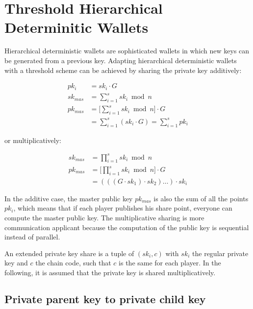 \section{Threshold Hierarchical Determinitic Wallets}

Hierarchical deterministic wallets are sophisticated wallets in which new keys
can be generated from a previous key. Adapting hierarchical deterministic
wallets with a threshold scheme can be achieved by sharing the private key
additively:

\begin{equation*}
\begin{split}
  pk_i     &= sk_i \cdot G \\
  sk_{mas} &= \sum_{i=1}^{s} sk_i \bmod n \\
  pk_{mas} &= \Bigg[ \sum_{i=1}^{s} sk_i \bmod n \Bigg] \cdot G \\
           &= \sum_{i=1}^{s} (sk_i \cdot G) = \sum_{i=1}^{s} pk_i
\end{split}
\end{equation*}

or multiplicatively:

\begin{equation*}
\begin{split}
  sk_{mas} &= \prod_{i=1}^{s} sk_i \bmod n \\
  pk_{mas} &= \Bigg[ \prod_{i=1}^{s} sk_i \bmod n \Bigg] \cdot G \\
           &= (((G \cdot sk_1) \cdot sk_2) \dots )\cdot sk_i
\end{split}
\end{equation*}

In the additive case, the master public key $pk_{mas}$ is also the sum of all
the points $pk_i$, which means that if each player publishes his share point,
everyone can compute the master public key. The multiplicative sharing is more
communication applicant because the computation of the public key is sequential
instead of parallel.

An extended private key share is a tuple of $(sk_i, c)$ with $sk_i$ the regular
private key and $c$ the chain code, such that $c$ is the same for each player.
In the following, it is assumed that the private key is shared multiplicatively.

\subsection{Private parent key to private child key}

